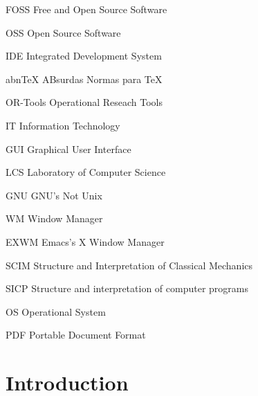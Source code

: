 \documentclass[
12pt,				%
openright,			%
oneside,			%
a4paper,			%
brazil,				%
english,			%
]{abntex2}
\begin{document}
\begin{siglas}
\item[FOSS] Free and Open Source Software
\item[OSS] Open Source Software
\item[IDE] Integrated Development System 
\item[abnTeX] ABsurdas Normas para TeX
\item[OR-Tools] Operational Reseach Tools
\item[IT] Information Technology
\item[GUI] Graphical User Interface
\item[LCS] Laboratory of Computer Science
\item[GNU] GNU's Not Unix
\item[WM] Window Manager
\item[EXWM] Emacs's X Window Manager
\item[SCIM] Structure and Interpretation of Classical Mechanics
\item[SICP]Structure and interpretation of computer programs
\item[OS] Operational System
\item[PDF] Portable Document Format
\end{siglas}


\tableofcontents*
\cleardoublepage



\textual


\chapter[Introduction]{Introduction}
\end{document}
